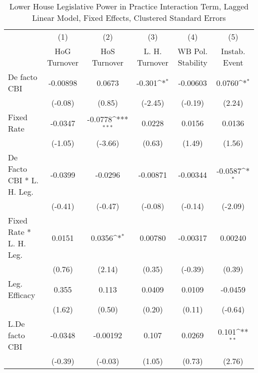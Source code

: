 {
\def\sym#1{\ifmmode^{#1}\else\(^{#1}\)\fi}
\begin{longtable}{l*{5}{c}}
\caption{Lower House Legislative Power in Practice Interaction Term, Lagged Linear Model, Fixed Effects, Clustered Standard Errors \label{llpintlagsDF}}\\
\hline\hline\endfirsthead\hline\endhead\hline\endfoot\endlastfoot
                &\multicolumn{1}{c}{(1)}&\multicolumn{1}{c}{(2)}&\multicolumn{1}{c}{(3)}&\multicolumn{1}{c}{(4)}&\multicolumn{1}{c}{(5)}\\
                &\multicolumn{1}{c}{HoG Turnover}&\multicolumn{1}{c}{HoS Turnover}&\multicolumn{1}{c}{L. H. Turnover}&\multicolumn{1}{c}{WB Pol. Stability}&\multicolumn{1}{c}{Instab. Event}\\
\hline
De facto CBI    & -0.00898         &   0.0673         &   -0.301\sym{*}  & -0.00603         &   0.0760\sym{*}  \\
                &  (-0.08)         &   (0.85)         &  (-2.45)         &  (-0.19)         &   (2.24)         \\
[1em]
Fixed Rate      &  -0.0347         &  -0.0778\sym{***}&   0.0228         &   0.0156         &   0.0136         \\
                &  (-1.05)         &  (-3.66)         &   (0.63)         &   (1.49)         &   (1.56)         \\
[1em]
De Facto CBI * L. H. Leg.&  -0.0399         &  -0.0296         & -0.00871         & -0.00344         &  -0.0587\sym{*}  \\
                &  (-0.41)         &  (-0.47)         &  (-0.08)         &  (-0.14)         &  (-2.09)         \\
[1em]
Fixed Rate * L. H. Leg.&   0.0151         &   0.0356\sym{*}  &  0.00780         & -0.00317         &  0.00240         \\
                &   (0.76)         &   (2.14)         &   (0.35)         &  (-0.39)         &   (0.39)         \\
[1em]
Leg. Efficacy   &    0.355         &    0.113         &   0.0409         &   0.0109         &  -0.0459         \\
                &   (1.62)         &   (0.50)         &   (0.20)         &   (0.11)         &  (-0.64)         \\
[1em]
L.De facto CBI  &  -0.0348         & -0.00192         &    0.107         &   0.0269         &    0.101\sym{**} \\
                &  (-0.39)         &  (-0.03)         &   (1.05)         &   (0.73)         &   (2.76)         \\

\end{longtable}}
